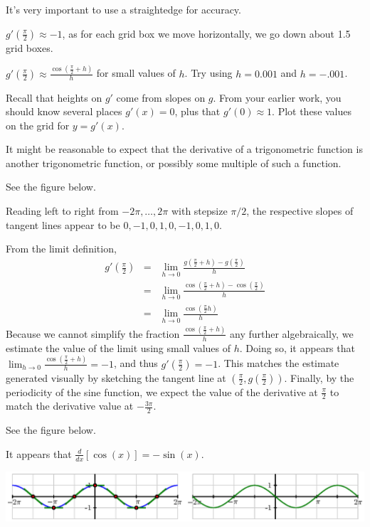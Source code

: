 \begin{bighint}
\ba
	\item It's very important to use a straightedge for accuracy.
	\item $g'(\frac{\pi}{2}) \approx -1$, as for each grid box we move horizontally, we go down about 1.5 grid boxes.
	\item $g'(\frac{\pi}{2}) \approx \frac{\cos(\frac{\pi}{2}+h)}{h}$ for small values of $h$.  Try using $h = 0.001$ and $h = -.001$. 
	\item Recall that heights on $g'$ come from slopes on $g$.  From your earlier work, you should know several places $g'(x) = 0$, plus that $g'(0) \approx 1$.  Plot these values on the grid for $y = g'(x)$.
	\item It might be reasonable to expect that the derivative of a trigonometric function is another trigonometric function, or possibly some multiple of such a function.
\ea 
\end{bighint}
\begin{activitySolution}
\ba
	\item See the figure below.
	\item Reading left to right from $-2\pi, \ldots, 2\pi$ with stepsize $\pi/2$, the respective slopes of tangent lines appear to be $0,-1,0,1,0,-1,0,1,0$.
	\item From the limit definition,
	\begin{eqnarray*}
	g'(\frac{\pi}{2}) & = & \lim_{h \to 0} \frac{g(\frac{\pi}{2} + h) - g(\frac{\pi}{2})}{h} \\
	       & = & \lim_{h \to 0} \frac{\cos(\frac{\pi}{2} + h) - \cos(\frac{\pi}{2})}{h} \\
	       & = & \lim_{h \to 0} \frac{\cos(\frac{\pi}{2}h)}{h} 
	\end{eqnarray*}
	Because we cannot simplify the fraction $\frac{\cos(\frac{\pi}{2}+h)}{h}$ any further algebraically, we estimate the value of the limit using small values of $h$.  Doing so, it appears that $\lim_{h \to 0} \frac{\cos(\frac{\pi}{2}+h)}{h}  = -1$, and thus $g'(\frac{\pi}{2}) = -1$.  This matches the estimate generated visually by sketching the tangent line at $(\frac{\pi}{2},g(\frac{\pi}{2}))$.  Finally, by the periodicity of the sine function, we expect the value of the derivative at $\frac{\pi}{2}$ to match the derivative value at $-\frac{3\pi}{2}$.
	\item See the figure below.
	\item It appears that $\frac{d}{dx}[\cos(x)] = -\sin(x)$.
\ea
\begin{center}
\includegraphics{figures/2_2_cosineSoln.eps}
\end{center}
\end{activitySolution}
\aftera